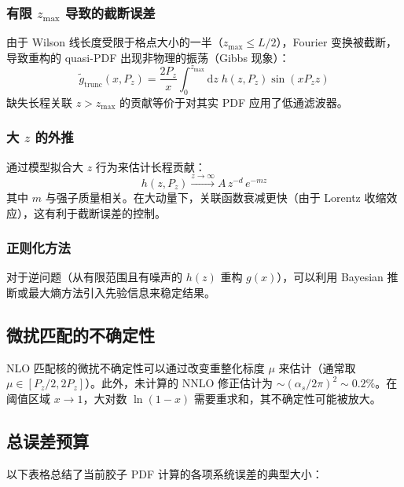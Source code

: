 \documentclass[11pt,a4paper]{ctexart}
\begin{document}
\subsubsection{有限 $z_{\text{max}}$ 导致的截断误差}

由于 Wilson 线长度受限于格点大小的一半（$z_{\text{max}} \le L/2$），Fourier 变换被截断，导致重构的 quasi-PDF 出现非物理的振荡（Gibbs 现象）：
\begin{equation}
\tilde{g}_{\text{trunc}}(x, P_z) = \frac{2P_z}{x} \int_{0}^{z_{\text{max}}} \mathrm{d}z \;
h(z, P_z) \sin(x P_z z)
\end{equation}
缺失长程关联 $z > z_{\text{max}}$ 的贡献等价于对其实 PDF 应用了低通滤波器。

\subsubsection{大 $z$ 的外推}

通过模型拟合大 $z$ 行为来估计长程贡献：
\begin{equation}
h(z, P_z) \xrightarrow{z \to \infty} A \, z^{-d} \, e^{-m z}
\end{equation}
其中 $m$ 与强子质量相关。在大动量下，关联函数衰减更快（由于 Lorentz 收缩效应），这有利于截断误差的控制。

\subsubsection{正则化方法}

对于逆问题（从有限范围且有噪声的 $h(z)$ 重构 $g(x)$），可以利用 Bayesian 推断或最大熵方法引入先验信息来稳定结果。

\subsection{微扰匹配的不确定性}

NLO 匹配核的微扰不确定性可以通过改变重整化标度 $\mu$ 来估计（通常取 $\mu \in [P_z/2, 2P_z]$）。此外，未计算的 NNLO 修正估计为 $\sim (\alpha_s/2\pi)^2 \sim 0.2\%$。在阈值区域 $x \to 1$，大对数 $\ln(1-x)$ 需要重求和，其不确定性可能被放大。

\subsection{总误差预算}

以下表格总结了当前胶子 PDF 计算的各项系统误差的典型大小：
\end{document}
